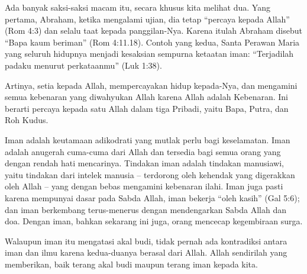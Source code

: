 \newpage
{}
\setcounter{kgkcounter}{25}
{\normalsize

     Ada banyak saksi-saksi macam itu, secara khusus kita melihat dua. Yang 
pertama, Abraham, ketika mengalami ujian, dia tetap ``percaya kepada Allah''
(Rom 4:3) dan selalu taat kepada panggilan-Nya. Karena itulah Abraham disebut
          ``Bapa kaum beriman'' (Rom 4:11.18). Contoh yang kedua, Santa Perawan Maria
          yang seluruh hidupnya menjadi kesaksian sempurna ketaatan iman: ``Terjadilah
          padaku menurut perkataanmu'' (Luk 1:38).

Artinya, setia kepada Allah, mempercayakan hidup kepada-Nya, dan mengamini semua kebenaran yang diwahyukan Allah karena Allah adalah Kebenaran.
          Ini berarti percaya kepada satu Allah dalam tiga Pribadi, yaitu Bapa, Putra, dan Roh
          Kudus.

Iman adalah keutamaan adikodrati yang mutlak perlu bagi keselamatan. Iman
adalah anugerah cuma-cuma dari Allah dan tersedia bagi semua orang yang dengan
          rendah hati mencarinya. Tindakan iman adalah tindakan manusiawi, yaitu tindakan
          dari intelek manusia -- terdorong oleh kehendak yang digerakkan oleh Allah -- yang
          dengan bebas mengamini kebenaran ilahi. Iman juga pasti karena mempunyai dasar
          pada Sabda Allah, iman bekerja ``oleh kasih'' (Gal 5:6); dan iman berkembang terus-menerus dengan mendengarkan Sabda Allah dan doa. Dengan iman, bahkan
          sekarang ini juga, orang mencecap kegembiraan surga.

Walaupun iman itu mengatasi akal budi, tidak pernah ada kontradiksi antara
          iman dan ilmu karena kedua-duanya berasal dari Allah. Allah sendirilah yang
          memberikan, baik terang akal budi maupun terang iman kepada kita.

}
